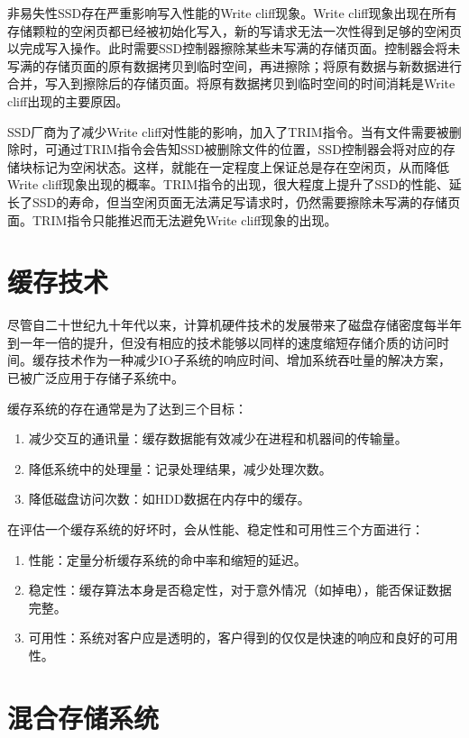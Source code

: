 \begin{enumerate}
非易失性SSD存在严重影响写入性能的Write cliff现象。Write cliff现象出现在所有存储颗粒的空闲页都已经被初始化写入，新的写请求无法一次性得到足够的空闲页以完成写入操作。此时需要SSD控制器擦除某些未写满的存储页面。控制器会将未写满的存储页面的原有数据拷贝到临时空间，再进擦除；将原有数据与新数据进行合并，写入到擦除后的存储页面。将原有数据拷贝到临时空间的时间消耗是Write cliff出现的主要原因。

SSD厂商为了减少Write cliff对性能的影响，加入了TRIM指令。当有文件需要被删除时，可通过TRIM指令会告知SSD被删除文件的位置，SSD控制器会将对应的存储块标记为空闲状态。这样，就能在一定程度上保证总是存在空闲页，从而降低Write cliff现象出现的概率。TRIM指令的出现，很大程度上提升了SSD的性能、延长了SSD的寿命，但当空闲页面无法满足写请求时，仍然需要擦除未写满的存储页面。TRIM指令只能推迟而无法避免Write cliff现象的出现。

\end{enumerate}

\section{缓存技术}
\label{sec:cache_tech}

尽管自二十世纪九十年代以来，计算机硬件技术的发展带来了磁盘存储密度每半年到一年一倍的提升，但没有相应的技术能够以同样的速度缩短存储介质的访问时间。缓存技术作为一种减少IO子系统的响应时间、增加系统吞吐量的解决方案，已被广泛应用于存储子系统中。

缓存系统的存在通常是为了达到三个目标：
\begin{enumerate}
\item 减少交互的通讯量：缓存数据能有效减少在进程和机器间的传输量。
\item 降低系统中的处理量：记录处理结果，减少处理次数。
\item 降低磁盘访问次数：如HDD数据在内存中的缓存。
\end{enumerate}

在评估一个缓存系统的好坏时，会从性能、稳定性和可用性三个方面进行：
\begin{enumerate}
\item 性能：定量分析缓存系统的命中率和缩短的延迟。
\item 稳定性：缓存算法本身是否稳定性，对于意外情况（如掉电），能否保证数据完整。
\item 可用性：系统对客户应是透明的，客户得到的仅仅是快速的响应和良好的可用性。
\end{enumerate}

\section{混合存储系统}
\label{sec:hybrid_storage}

